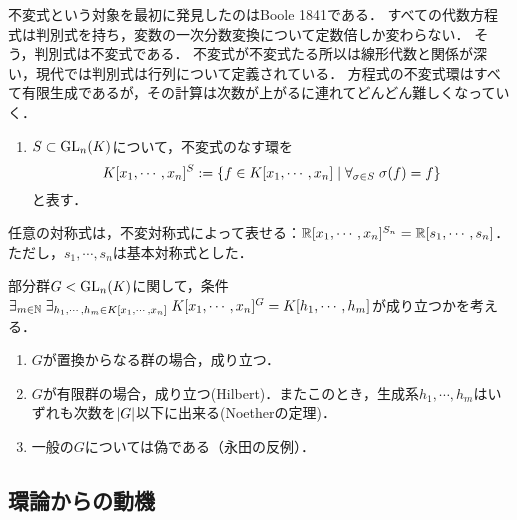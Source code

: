 \documentclass[uplatex,dvipdfmx]{jsreport}
\begin{document}
\begin{history}
    不変式という対象を最初に発見したのはBoole 1841である．
    すべての代数方程式は判別式を持ち，変数の一次分数変換について定数倍しか変わらない．
    そう，判別式は不変式である．
    不変式が不変式たる所以は線形代数と関係が深い，現代では判別式は行列について定義されている．
    方程式の不変式環はすべて有限生成であるが，その計算は次数が上がるに連れてどんどん難しくなっていく．
\end{history}

\begin{definition}\mbox{}
    \begin{enumerate}
        \item $S\subset\mathrm{GL}_n(K)$について，不変式のなす環を
        \[K[x_1,\cdots,x_n]^S:=\left\{f\in K[x_1,\cdots,x_n]\mid\forall_{\sigma\in S}\;\sigma(f)=f\right\}\]
        と表す．
    \end{enumerate}
\end{definition}

\begin{corollary}
    任意の対称式は，不変対称式によって表せる：$\mathbb{R}[x_1,\cdots,x_n]^{S_n}=\mathbb{R}[s_1,\cdots,s_n]$．ただし，$s_1,\cdots,s_n$は基本対称式とした．
\end{corollary}

\begin{theorem}[Hilbert 14]
    部分群$G<\mathrm{GL}_n(K)$に関して，条件
    $\exists_{m\in\mathbb{N}}\;\exists_{h_1,\cdots,h_m\in K[x_1,\cdots,x_n]}\;K[x_1,\cdots,x_n]^G=K[h_1,\cdots,h_m]$が成り立つかを考える．
    \begin{enumerate}
        \item $G$が置換からなる群の場合，成り立つ．
        \item $G$が有限群の場合，成り立つ(Hilbert)．またこのとき，生成系$h_1,\cdots,h_m$はいずれも次数を$\lvert G\rvert$以下に出来る(Noetherの定理)．
        \item 一般の$G$については偽である（永田の反例）．
    \end{enumerate}
\end{theorem}

\subsection{環論からの動機}
\end{document}
